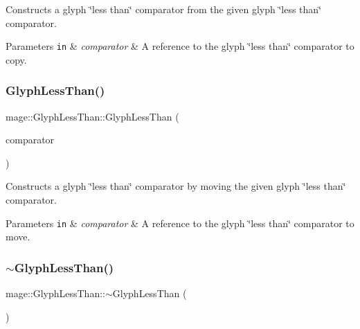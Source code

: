 Constructs a glyph \char`\"{}less than\char`\"{} comparator from the given glyph \char`\"{}less than\char`\"{} comparator.


\begin{DoxyParams}[1]{Parameters}
\mbox{\tt in}  & {\em comparator} & A reference to the glyph \char`\"{}less than\char`\"{} comparator to copy. \\
\hline
\end{DoxyParams}
\hypertarget{structmage_1_1_glyph_less_than_ae41c3b9b7ecf202b5518f911342e170c}{}\label{structmage_1_1_glyph_less_than_ae41c3b9b7ecf202b5518f911342e170c} 
\subsubsection{\texorpdfstring{Glyph\+Less\+Than()}{GlyphLessThan()}\hspace{0.1cm}{\footnotesize\ttfamily [3/3]}}
{\footnotesize\ttfamily mage\+::\+Glyph\+Less\+Than\+::\+Glyph\+Less\+Than (\begin{DoxyParamCaption}\item[{\hyperlink{structmage_1_1_glyph_less_than}{Glyph\+Less\+Than} \&\&}]{comparator }\end{DoxyParamCaption})\hspace{0.3cm}{\ttfamily [default]}}

Constructs a glyph \char`\"{}less than\char`\"{} comparator by moving the given glyph \char`\"{}less than\char`\"{} comparator.


\begin{DoxyParams}[1]{Parameters}
\mbox{\tt in}  & {\em comparator} & A reference to the glyph \char`\"{}less than\char`\"{} comparator to move. \\
\hline
\end{DoxyParams}
\hypertarget{structmage_1_1_glyph_less_than_ace50804a419a31b0413566b5aba2eeac}{}\label{structmage_1_1_glyph_less_than_ace50804a419a31b0413566b5aba2eeac} 
\subsubsection{\texorpdfstring{$\sim$\+Glyph\+Less\+Than()}{~GlyphLessThan()}}
{\footnotesize\ttfamily mage\+::\+Glyph\+Less\+Than\+::$\sim$\+Glyph\+Less\+Than (\begin{DoxyParamCaption}{ }\end{DoxyParamCaption})\hspace{0.3cm}{\ttfamily [default]}}

